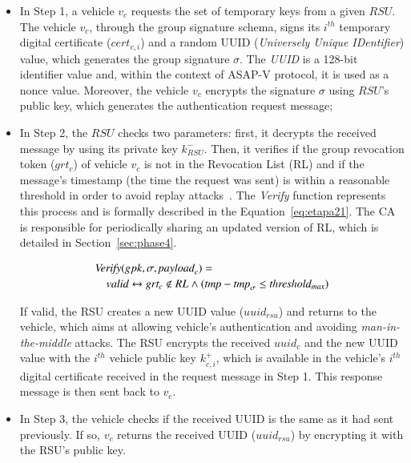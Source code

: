 \documentclass[preprint,12pt]{elsarticle}
\begin{document}
\begin{itemize}
	\item In Step 1, a vehicle $v_{c}$ requests the set of temporary keys from a given $RSU$. The vehicle $v_{c}$, through the group signature schema, signs its $i^{th}$ temporary digital certificate ($cert_{c,i}$) and a random UUID (\textit{Universely Unique IDentifier}) value, which generates the group signature $\sigma$. The \textit{UUID} is a 128-bit identifier value and, within the context of ASAP-V protocol, it is used as a nonce value. Moreover, the vehicle $v_{c}$ encrypts the signature $\sigma$ using $RSU$'s public key, which generates the authentication request message;
		
	\item  In Step 2, the $RSU$ checks two parameters: first, it decrypts the received message by using its private key $k^{-}_{RSU}$. Then, it verifies if the group revocation token ($grt_{c}$) of vehicle $v_{c}$ is not in the Revocation List (RL) and if the message's timestamp (the time the request was  sent) is within a reasonable threshold in order to avoid replay attacks~\cite{replay-attack}. The \textit{Verify} function represents this process and is formally described in the Equation~\ref{eq:etapa21}. The CA is responsible for periodically sharing an updated version of RL, which is detailed in Section~\ref{sec:phase4}.

	\begin{equation}
    \begin{multlined}
	\label{eq:etapa21}
		\mathrm{\textit{Verify}}(gpk, \sigma, \mathrm{\textit{payload}}_{c}) = \\
        \mathrm{\textit{valid}} \leftrightarrow grt_{c} \notin RL \wedge (\textrm{\textit{tmp}} - \mathrm{\textit{tmp}}_{\sigma} \le \mathrm{\textit{threshold}}_{\mathrm{\textit{max}}})
    \end{multlined}
	\end{equation}			
	
	If valid, the RSU creates a new UUID value ($uuid_{rsu}$) and returns to the vehicle, which aims at allowing vehicle's authentication and avoiding \textit{man-in-the-middle} attacks. The RSU encrypts the received $uuid_{c}$ and the new UUID value with the $i^{th}$ vehicle public key $k^{+}_{c,i}$, which is available in the vehicle's $i^{th}$ digital certificate received in the request message in Step 1. This response message is then sent back to $v_c$.
	
	\item In Step 3, the vehicle checks if the received UUID is the same as it had sent previously. If so, $v_{c}$ returns the received UUID ($uuid_{rsu}$) by encrypting it with the RSU's public key.
	

\end{itemize}
\end{document}

